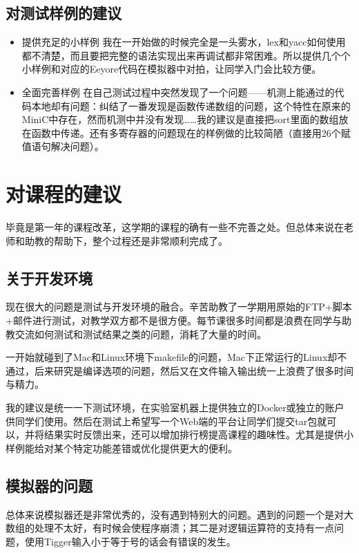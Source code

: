\documentclass{ctexart}
\begin{document}
\subsection{对测试样例的建议}
\begin{itemize}
  \item 提供充足的小样例
  我在一开始做的时候完全是一头雾水，lex和yacc如何使用都不清楚，而且要把完整的语法实现出来再调试都非常困难。所以提供几个个小样例和对应的Eeyore代码在模拟器中对拍，让同学入门会比较方便。
  \item 全面完善样例
  在自己测试过程中突然发现了一个问题——机测上能通过的代码本地却有问题：纠结了一番发现是函数传递数组的问题，这个特性在原来的MiniC中存在，然而机测中并没有发现……我的建议是直接把sort里面的数组放在函数中传递。还有多寄存器的问题现在的样例做的比较简陋（直接用26个赋值语句解决问题）。
\end{itemize}

\section{对课程的建议}
毕竟是第一年的课程改革，这学期的课程的确有一些不完善之处。但总体来说在老师和助教的帮助下，整个过程还是非常顺利完成了。
\subsection{关于开发环境}
现在很大的问题是测试与开发环境的融合。辛苦助教了一学期用原始的FTP+脚本+邮件进行测试，对教学双方都不是很方便。每节课很多时间都是浪费在同学与助教交流如何测试和测试结果之类的问题，消耗了大量的时间。

一开始就碰到了Mac和Linux环境下makefile的问题，Mac下正常运行的Linux却不通过，后来研究是编译选项的问题，然后又在文件输入输出统一上浪费了很多时间与精力。

我的建议是统一一下测试环境，在实验室机器上提供独立的Docker或独立的账户供同学们使用。然后在测试上希望写一个Web端的平台让同学们提交tar包就可以，并将结果实时反馈出来，还可以增加排行榜提高课程的趣味性。尤其是提供小样例能给对某个特定功能差错或优化提供更大的便利。

\subsection{模拟器的问题}
总体来说模拟器还是非常优秀的，没有遇到特别大的问题。遇到的问题一个是对大数组的处理不太好，有时候会使程序崩溃；其二是对逻辑运算符的支持有一点问题，使用Tigger输入小于等于号的话会有错误的发生。
\end{document}
